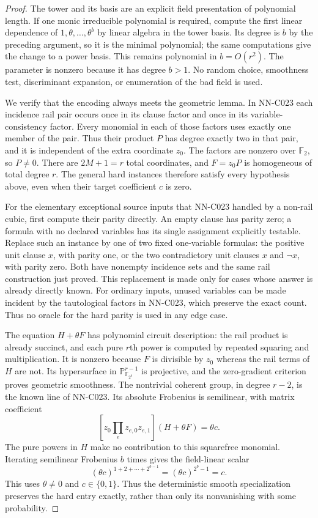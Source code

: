 \begin{proof}
The tower and its basis are an explicit field presentation of polynomial length. If one monic irreducible polynomial is required, compute the first linear dependence of $1,\theta,\ldots,\theta^b$ by linear algebra in the tower basis. Its degree is $b$ by the preceding argument, so it is the minimal polynomial; the same computations give the change to a power basis. This remains polynomial in $b=O(r^2)$. The parameter is nonzero because it has degree $b>1$. No random choice, smoothness test, discriminant expansion, or enumeration of the bad field is used.

We verify that the encoding always meets the geometric lemma. In NN-C023 each incidence rail pair occurs once in its clause factor and once in its variable-consistency factor. Every monomial in each of those factors uses exactly one member of the pair. Thus their product $P$ has degree exactly two in that pair, and it is independent of the extra coordinate $z_0$. The factors are nonzero over $\mathbb F_2$, so $P\ne0$. There are $2M+1=r$ total coordinates, and $F=z_0P$ is homogeneous of total degree $r$. The general hard instances therefore satisfy every hypothesis above, even when their target coefficient $c$ is zero.

For the elementary exceptional source inputs that NN-C023 handled by a non-rail cubic, first compute their parity directly. An empty clause has parity zero; a formula with no declared variables has its single assignment explicitly testable. Replace such an instance by one of two fixed one-variable formulas: the positive unit clause $x$, with parity one, or the two contradictory unit clauses $x$ and $\neg x$, with parity zero. Both have nonempty incidence sets and the same rail construction just proved. This replacement is made only for cases whose answer is already directly known. For ordinary inputs, unused variables can be made incident by the tautological factors in NN-C023, which preserve the exact count. Thus no oracle for the hard parity is used in any edge case.

The equation $H+\theta F$ has polynomial circuit description: the rail product is already succinct, and each pure $r$th power is computed by repeated squaring and multiplication. It is nonzero because $F$ is divisible by $z_0$ whereas the rail terms of $H$ are not. Its hypersurface in $\mathbb P^{r-1}_{\mathbb F_{2^b}}$ is projective, and the zero-gradient criterion proves geometric smoothness. The nontrivial coherent group, in degree $r-2$, is the known line of NN-C023. Its absolute Frobenius is semilinear, with matrix coefficient
\[
          [z_0\prod_e z_{e,0}z_{e,1}](H+\theta F)=\theta c.
\]
The pure powers in $H$ make no contribution to this squarefree monomial. Iterating semilinear Frobenius $b$ times gives the field-linear scalar
\[
                   (\theta c)^{1+2+\cdots+2^{b-1}}
                      =(\theta c)^{2^b-1}=c.
\]
This uses $\theta\ne0$ and $c\in\{0,1\}$. Thus the deterministic smooth specialization preserves the hard entry exactly, rather than only its nonvanishing with some probability.


\end{proof}
